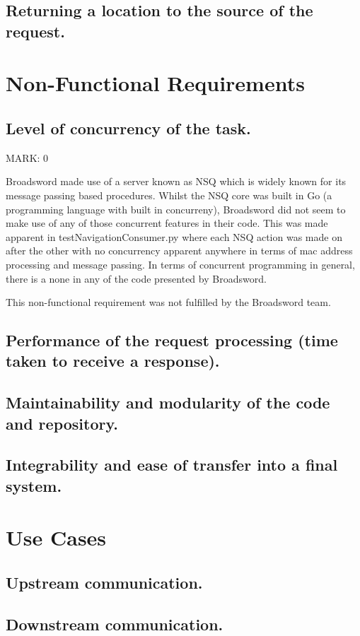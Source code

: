 \documentclass{article}
\begin{document}
\subsection{Returning a location to the source of the request.}


\section{Non-Functional Requirements}

\subsection{Level of concurrency of the task.}
\begin{flushleft}MARK: 0\end{flushleft}
Broadsword made use of a server known as NSQ which is widely known for its message passing based procedures. Whilst the NSQ core was built in Go (a programming language with built in concurreny), Broadsword did not seem to make use of any of those concurrent features in their code. This was made apparent in testNavigationConsumer.py where each NSQ action was made on after the other with no concurrency apparent anywhere in terms of mac address processing and message passing. In terms of concurrent programming in general, there is a none in any of the code presented by Broadsword. 
\begin{flushleft}This non-functional requirement was not fulfilled by the Broadsword team.\end{flushleft}

\subsection{Performance of the request processing (time taken to receive a response).}

\subsection{Maintainability and modularity of the code and repository.}

\subsection{Integrability and ease of transfer into a final system.}


\section{Use Cases}

\subsection{Upstream communication.}

\subsection{Downstream communication.}
\end{document}

